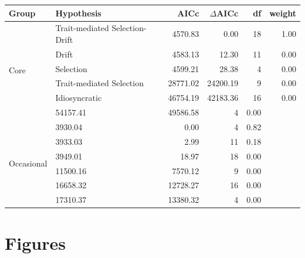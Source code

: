 \documentclass[12pt]{article}
\begin{document}
\begin{table}[]
\begin{tabular}{llrrrr}
\toprule
\textbf{Group}    & \textbf{Hypothesis}          & \textbf{AICc} & \textbf{{$\Delta$}AICc} & \textbf{df} & \textbf{weight} \\ \hline
\multirow{6}{*}{Core}   & Trait-mediated Selection-Drift     & 4570.83       & 0.00                    & 18          & 1.00            \\ 
                         & Drift     & 4583.13       & 12.30                   & 11          & 0.00            \\ 
                         & Selection    & 4599.21       & 28.38                   & 4           & 0.00            \\ 
                       & Trait-mediated Selection      & 28771.02      & 24200.19                & 9           & 0.00            \\  
                  & Idiosyncratic            & 46754.19      & 42183.36                & 16          & 0.00            \\ \
                            & 54157.41      & 49586.58                & 4           & 0.00            \\ \hline
\multirow{6}{*}{Occasional} & 3930.04       & 0.00                    & 4           & 0.82            \\ 
                            & 3933.03       & 2.99                    & 11          & 0.18            \\ 
                            & 3949.01       & 18.97                   & 18          & 0.00            \\ 
                            & 11500.16      & 7570.12                 & 9           & 0.00            \\ 
                            & 16658.32      & 12728.27                & 16          & 0.00            \\ 
                            & 17310.37      & 13380.32                & 4           & 0.00            \\  \bottomrule
\end{tabular}
\end{table}

\clearpage

\section*{Figures}
\end{document}
